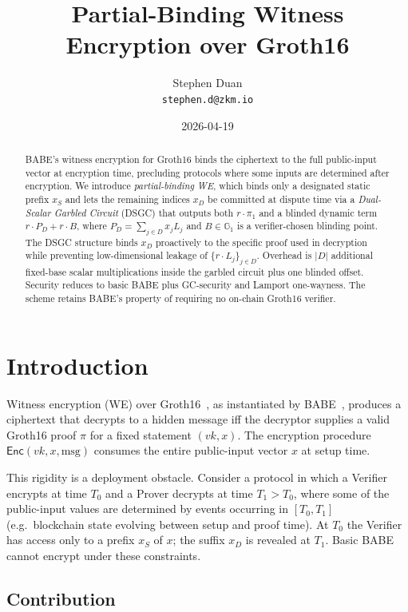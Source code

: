 \documentclass[11pt]{article}
\title{Partial-Binding Witness Encryption over Groth16}
\author{Stephen Duan\\\texttt{stephen.d@zkm.io}}
\date{2026-04-19}
\newcommand{\Gone}{\mathbb{G}_1}
\newcommand{\msg}{\mathrm{msg}}
\newcommand{\Enc}{\mathsf{Enc}}
\begin{document}
\maketitle

\begin{abstract}
BABE's witness encryption for Groth16 binds the ciphertext to the
full public-input vector at encryption time, precluding protocols
where some inputs are determined after encryption. We introduce
\emph{partial-binding WE}, which binds only a designated static
prefix $x_S$ and lets the remaining indices $x_D$ be committed at
dispute time via a \emph{Dual-Scalar Garbled Circuit} (DSGC) that
outputs both $r \cdot \pi_1$ and a blinded dynamic term
$r \cdot P_D + r \cdot B$, where
$P_D = \sum_{j \in D} x_j L_j$ and $B \in \Gone$ is a verifier-chosen
blinding point. The DSGC structure binds $x_D$ proactively to the
specific proof used in decryption while preventing low-dimensional
leakage of $\{r \cdot L_j\}_{j \in D}$. Overhead is $|D|$
additional fixed-base scalar multiplications inside the garbled
circuit plus one blinded offset. Security reduces to basic BABE
plus GC-security and Lamport one-wayness. The scheme retains
BABE's property of requiring no on-chain Groth16 verifier.
\end{abstract}

\section{Introduction}

Witness encryption (WE) over Groth16~\cite{groth16}, as instantiated
by BABE~\cite{babe2026}, produces a ciphertext that decrypts to a
hidden message iff the decryptor supplies a valid Groth16 proof
$\pi$ for a fixed statement $(vk, x)$. The encryption procedure
$\Enc(vk, x, \msg)$ consumes the entire public-input vector $x$ at
setup time.

This rigidity is a deployment obstacle. Consider a protocol in which
a Verifier encrypts at time $T_0$ and a Prover decrypts at time
$T_1 > T_0$, where some of the public-input values are determined by
events occurring in $[T_0, T_1]$ (e.g.\ blockchain state evolving
between setup and proof time). At $T_0$ the Verifier has access only
to a prefix $x_S$ of $x$; the suffix $x_D$ is revealed at $T_1$.
Basic BABE cannot encrypt under these constraints.

\subsection{Contribution}
\end{document}
